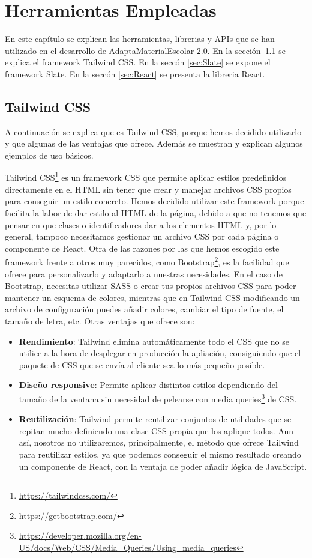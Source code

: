\chapter{Herramientas Empleadas}\label{ch:herramientas}

En este capítulo se explican las herramientas, librerias y APIs que se han utilizado en el desarrollo de AdaptaMaterialEscolar 2.0. En la sección~\ref{sec:tailwind} se explica el framework Tailwind CSS. En la seccón \ref{sec:Slate} se expone el framework Slate. En la seccón \ref{sec:React} se presenta la libreria React.

\section{Tailwind CSS}\label{sec:tailwind}
A continuación se explica que es Tailwind CSS, porque hemos decidido utilizarlo y que algunas de las ventajas que ofrece. Además se muestran y explican algunos ejemplos de uso básicos.

Tailwind CSS\footnote{\url{https://tailwindcss.com/}} es un framework CSS que permite aplicar estilos predefinidos directamente en el HTML sin tener que crear y manejar archivos CSS propios para conseguir un estilo concreto. Hemos decidido utilizar este framework porque facilita la labor de dar estilo al HTML de la página, debido a que no tenemos que pensar en que clases o identificadores dar a los elementos HTML y, por lo general, tampoco necesitamos gestionar un archivo CSS por cada página o componente de React. Otra de las razones por las que hemos escogido este framework frente a otros muy parecidos, como Bootstrap\footnote{\url{https://getbootstrap.com/}}, es la facilidad que ofrece para personalizarlo y adaptarlo a nuestras necesidades. En el caso de Bootstrap, necesitas utilizar SASS o crear tus propios archivos CSS para poder mantener un esquema de colores, mientras que en Tailwind CSS modificando un archivo de configuración puedes añadir colores, cambiar el tipo de fuente, el tamaño de letra, etc. Otras ventajas que ofrece son:
\begin{itemize}
    \item \textbf{Rendimiento}: Tailwind elimina automáticamente todo el CSS que no se utilice a la hora de desplegar en producción la apliación, consiguiendo que el paquete de CSS que se envía al cliente sea lo más pequeño posible.
    \item \textbf{Diseño responsive}: Permite aplicar distintos estilos dependiendo del tamaño de la ventana sin necesidad de pelearse con media queries\footnote{\url{https://developer.mozilla.org/en-US/docs/Web/CSS/Media_Queries/Using_media_queries}} de CSS.
    \item \textbf{Reutilización}: Tailwind permite reutilizar conjuntos de utilidades que se repitan mucho definiendo una clase CSS propia que los aplique todos. Aun así, nosotros no utilizaremos, principalmente, el método que ofrece Tailwind para reutilizar estilos, ya que podemos conseguir el mismo resultado creando un componente de React, con la ventaja de poder añadir lógica de JavaScript.
\end{itemize}

